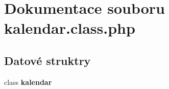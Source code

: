 \section{Dokumentace souboru kalendar.class.php}
\label{kalendar_8class_8php}
\subsection*{Datové struktry}
\begin{CompactItemize}
\item 
class {\bf kalendar}
\end{CompactItemize}
